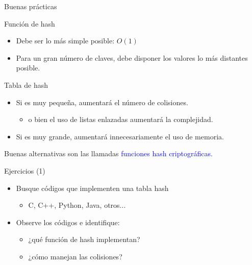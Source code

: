 \documentclass[handout]{beamer} %
\newcommand{\blue}[1]{\textcolor{blue}{#1}}
\begin{document}
\begin{frame}{Buenas prácticas}
    \begin{block}{Función de hash}
    \begin{itemize}
        \item Debe ser lo más simple posible: $O(1)$
        \item Para un gran número de claves, debe disponer los valores lo más distantes posible.
    \end{itemize}
    \end{block}
    \pause
    \begin{block}{Tabla de hash}
    \begin{itemize}
        \item Si es muy pequeña, aumentará el número de colisiones.
        \begin{itemize}
            \item o bien el uso de listas enlazadas aumentará la complejidad.
        \end{itemize}
        \item Si es muy grande, aumentará innecesariamente el uso de memoria.
    \end{itemize}
    \end{block}
    \pause
    Buenas alternativas son las llamadas \blue{funciones hash criptográficas}.
\end{frame}

\begin{frame}{Ejercicios (1)}
    \begin{itemize}
        \item Busque códigos que implementen una tabla hash
        \begin{itemize}
            \item C, C++, Python, Java, otros...
        \end{itemize}
        \item Observe los códigos e identifique:
        \begin{itemize}
            \item ¿qué función de hash implementan?
            \item ¿cómo manejan las colisiones?
        \end{itemize}
    \end{itemize}
\end{frame}
\end{document}
